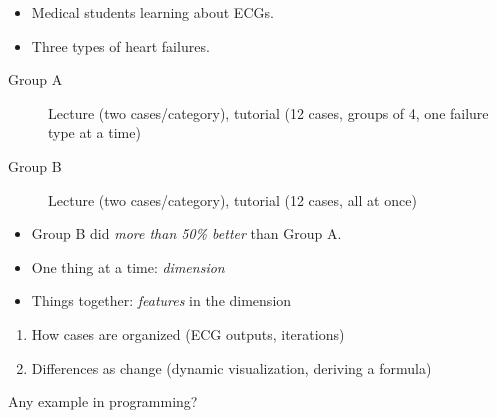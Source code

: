 \begin{frame}
  \begin{example}
    \begin{itemize}
      \item Medical students learning about ECGs.
      \item Three types of heart failures.
    \end{itemize}
    \begin{description}
      \item[Group A] Lecture (two cases/category), tutorial (12 cases,
        \alert<2->{groups of 4, one failure type at a time})
      \item[Group B] Lecture (two cases/category), tutorial (12 cases,
        \alert<2->{all at once})
    \end{description}
    \begin{itemize}
      \item<3> Group B did \emph{more than 50\% better} than Group A.
    \end{itemize}
  \end{example}
\end{frame}

\begin{frame}
  \begin{remark}
    \begin{itemize}
      \item One thing at a time: \emph{dimension}
      \item Things together: \emph{features} in the dimension
    \end{itemize}
  \end{remark}

  \pause

  \begin{remark}
    \begin{enumerate}
      \item How cases are organized (ECG outputs, iterations)
      \item Differences as change (dynamic visualization, deriving a formula)
    \end{enumerate}
  \end{remark}

  \begin{question}
    Any example in programming?
  \end{question}
\end{frame}


